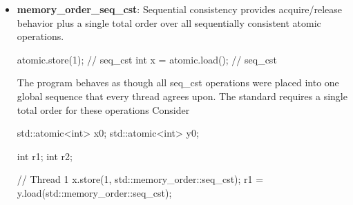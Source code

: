 \documentclass{report}
\begin{document}
\begin{itemize}
\begin{cppcode}
                int old = state.fetch_add(1, std::memory_order::acq_rel);
            \end{cppcode}
            \bigbreak \noindent 
            The operation can:
            \begin{itemize}
                \item Acquire information associated with the value it reads.
                \item Release preceding work through the new value it writes.
            \end{itemize}
            \bigbreak \noindent 
            This is invalid for pure loads and stores
            \bigbreak \noindent 
            \begin{cppcode}
                atomic.load(std::memory_order::acq_rel);   // Invalid
                atomic.store(1, std::memory_order::acq_rel); // Invalid
            \end{cppcode}
            \bigbreak \noindent 
            Use acquire for the load and release for the store.
        \item \textbf{memory\_order\_seq\_cst}: Sequential consistency provides acquire/release behavior plus a single total order over all sequentially consistent atomic operations.
            \bigbreak \noindent 
            \begin{cppcode}
                atomic.store(1);  // seq_cst
                int x = atomic.load();  // seq_cst
            \end{cppcode}
            The program behaves as though all seq\_cst operations were placed into one global sequence that every thread agrees upon. The standard requires a single total order for these operations
            \bigbreak \noindent 
            Consider
            \bigbreak \noindent 
            \begin{cppcode}
                std::atomic<int> x{0};
                std::atomic<int> y{0};

                int r1;
                int r2;
            \end{cppcode}
            \bigbreak \noindent 
            \begin{cppcode}
            // Thread 1
            x.store(1, std::memory_order::seq_cst);
            r1 = y.load(std::memory_order::seq_cst);


\end{cppcode}
\end{itemize}
\end{document}
